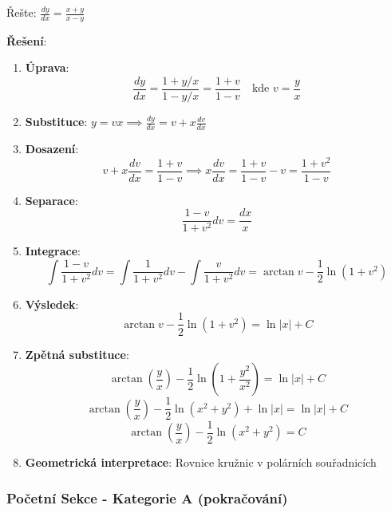 \begin{example}
Řešte: $\frac{dy}{dx} = \frac{x + y}{x - y}$
\vspace{0.3\baselineskip}

\textbf{Řešení}: 
\begin{enumerate}
\item \textbf{Úprava}:
\[
\frac{dy}{dx} = \frac{1 + y/x}{1 - y/x} = \frac{1 + v}{1 - v} \quad \text{kde } v = \frac{y}{x}
\]

\item \textbf{Substituce}: $y = vx \implies \frac{dy}{dx} = v + x\frac{dv}{dx}$

\item \textbf{Dosazení}:
\[
v + x\frac{dv}{dx} = \frac{1 + v}{1 - v} \implies x\frac{dv}{dx} = \frac{1 + v}{1 - v} - v = \frac{1 + v^2}{1 - v}
\]

\item \textbf{Separace}:
\[
\frac{1 - v}{1 + v^2}dv = \frac{dx}{x}
\]

\item \textbf{Integrace}:
\[
\int \frac{1 - v}{1 + v^2}dv = \int \frac{1}{1 + v^2}dv - \int \frac{v}{1 + v^2}dv = \arctan v - \frac{1}{2}\ln(1 + v^2)
\]

\item \textbf{Výsledek}:
\[
\arctan v - \frac{1}{2}\ln(1 + v^2) = \ln|x| + C
\]

\item \textbf{Zpětná substituce}:
\[
\arctan\left(\frac{y}{x}\right) - \frac{1}{2}\ln\left(1 + \frac{y^2}{x^2}\right) = \ln|x| + C
\]
\[
\arctan\left(\frac{y}{x}\right) - \frac{1}{2}\ln(x^2 + y^2) + \ln|x| = \ln|x| + C
\]
\[
\arctan\left(\frac{y}{x}\right) - \frac{1}{2}\ln(x^2 + y^2) = C
\]

\item \textbf{Geometrická interpretace}: Rovnice kružnic v polárních souřadnicích
\end{enumerate}
\end{example}

\vspace{0.8\baselineskip}






\subsubsection{Početní Sekce - Kategorie A (pokračování)}
\label{subsubsec:pocetni-kategorie-a-pokracovani}

